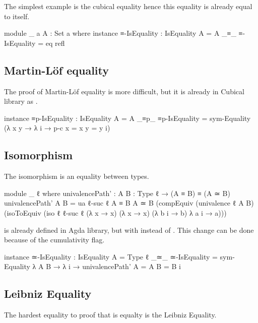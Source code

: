 \documentclass{article}
\begin{document}
The simplest example is the cubical equality hence this equality is already equal to itself.

\begin{code}
module _ {a} {A : Set a} where
  instance
    ≡-IsEquality : IsEquality {A = A} _≡_
    ≡-IsEquality = eq refl
\end{code}

\subsection{Martin-Löf equality}

The proof of Martin-Löf equality is more difficult, but it is already in Cubical library as .

\begin{code}
  instance
    ≡p-IsEquality : IsEquality {A = A} _≡p_
    ≡p-IsEquality = sym-Equality (λ {x y} → λ i → p-c {x = x} {y = y} i)
\end{code}

\subsection{Isomorphism}

The isomorphism is an equality between types.

\begin{code}
module _ {ℓ} where
  univalencePath' : {A B : Type ℓ} → (A ≡ B) ≡ (A ≃ B)
  univalencePath' {A} {B} =
    ua {ℓ-suc ℓ} {A ≡ B} {A ≃ B} (compEquiv (univalence {ℓ} {A} {B})
    (isoToEquiv (iso {ℓ} {ℓ-suc ℓ}
    (λ x → x) (λ x → x) (λ b i → b) λ a i → a)))
\end{code}

 is already defined in Agda library, but with  instead of
. This change can be done because of the cumulativity flag.

\begin{code}
  instance
    ≃-IsEquality : IsEquality
      {A = Type ℓ} _≃_
    ≃-IsEquality = sym-Equality λ {A B} →
      λ i → univalencePath' {A = A} {B = B} i
\end{code}

\subsection{Leibniz Equality}

The hardest equality to proof that is equalty is the Leibniz Equality.
\end{document}
